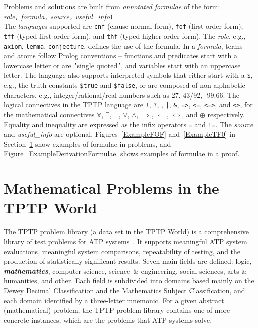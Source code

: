\documentclass[runningheads]{llncs}
\newcommand{\smalltt}[1]{\small \texttt{#1}}
\begin{document}
Problems and solutions are built from {\em annotated formulae} of the form: \\
{\em role}{\tt ,}
{\em formula}{\tt ,}
{\em source}{\tt ,}
{\em useful\_info}{\tt )}\\
The {\em language}s supported are {\smalltt{cnf}} (clause normal form), {\smalltt{fof}}
(first-order form), {\smalltt{tff}} (typed first-order form), and {\smalltt{thf}}
(typed higher-order form).
The {\em role}, e.g., {\smalltt{axiom}}, {\smalltt{lemma}}, {\smalltt{conjecture}}, defines the 
use of the formula.
In a {\em formula}, terms and atoms follow Prolog conventions -- functions and predicates start 
with a lowercase letter or are {\tt '}single quoted{\tt '}, and variables start with an uppercase 
letter.
The language also supports interpreted symbols that either start with a {\tt \$}, e.g., the 
truth constants {\smalltt{\$true}} and {\smalltt{\$false}}, or are composed of 
non-alphabetic characters, e.g., integer/rational/real numbers such as 27, 43/92, -99.66.
The logical connectives in the TPTP language are
{\tt !}, {\tt ?}, {\tt {\raisebox{0.4ex}{\texttildelow}}}, {\tt |}, {\tt \&}, {\tt =>}, {\tt <=},
{\tt <=>}, and {\tt <{\raisebox{0.4ex}{\texttildelow}}>},
for the mathematical connectives
$\forall$, $\exists$, $\neg$, $\vee$, $\wedge$, $\Rightarrow$, $\Leftarrow$, $\Leftrightarrow$, 
and $\oplus$ respectively.
Equality and inequality are expressed as the infix operators {\tt =} and {\tt !=}.
The {\em source} and {\em useful\_info} are optional.
Figures~\ref{ExampleFOF} and~\ref{ExampleTF0} in Section~\ref{TPTP} show examples of formulae in
problems, and Figure~\ref{ExampleDerivationFormulae} shows examples of formulae in a proof.

\section{Mathematical Problems in the TPTP World}
\label{TPTP}

The TPTP problem library (a data set in the TPTP World) is a comprehensive library of test 
problems for ATP systems~\cite{Sut09}.
It supports meaningful ATP system evaluations, meaningful system comparisons, repeatability of 
testing, and the production of statistically significant results. 
Seven main fields are defined: logic, {\bf {\em mathematics}}, computer science, science~\& 
engineering, social sciences, arts \& humanities, and other. 
Each field is subdivided into domains based mainly on the Dewey Decimal Classification and the 
Mathematics Subject Classification, and each domain identified by a three-letter mnemonic.
For a given abstract (mathematical) problem, the TPTP problem library contains one of more
concrete instances, which are the problems that ATP systems solve. 
\end{document}
